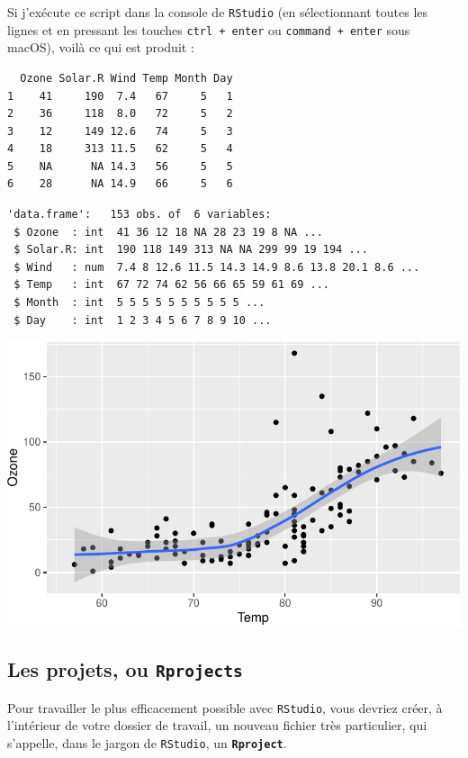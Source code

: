 \documentclass[
  a4paper,
  DIV=11,
  numbers=noendperiod,
  oneside]{scrreprt}
\begin{document}
Si j'exécute ce script dans la console de \texttt{RStudio} (en
sélectionnant toutes les lignes et en pressant les touches
\texttt{ctrl\ +\ enter} ou \texttt{command\ +\ enter} sous macOS), voilà
ce qui est produit :

\begin{verbatim}
  Ozone Solar.R Wind Temp Month Day
1    41     190  7.4   67     5   1
2    36     118  8.0   72     5   2
3    12     149 12.6   74     5   3
4    18     313 11.5   62     5   4
5    NA      NA 14.3   56     5   5
6    28      NA 14.9   66     5   6
\end{verbatim}

\begin{verbatim}
'data.frame':   153 obs. of  6 variables:
 $ Ozone  : int  41 36 12 18 NA 28 23 19 8 NA ...
 $ Solar.R: int  190 118 149 313 NA NA 299 99 19 194 ...
 $ Wind   : num  7.4 8 12.6 11.5 14.3 14.9 8.6 13.8 20.1 8.6 ...
 $ Temp   : int  67 72 74 62 56 66 65 59 61 69 ...
 $ Month  : int  5 5 5 5 5 5 5 5 5 5 ...
 $ Day    : int  1 2 3 4 5 6 7 8 9 10 ...
\end{verbatim}

\includegraphics{01-R-basics_files/figure-pdf/unnamed-chunk-3-1.pdf}

\subsection{\texorpdfstring{Les projets, ou
\texttt{Rprojects}}{Les projets, ou Rprojects}}\label{les-projets-ou-rprojects}

Pour travailler le plus efficacement possible avec \texttt{RStudio},
vous devriez créer, à l'intérieur de votre dossier de travail, un
nouveau fichier très particulier, qui s'appelle, dans le jargon de
\texttt{RStudio}, un \textbf{\texttt{Rproject}}.
\end{document}
